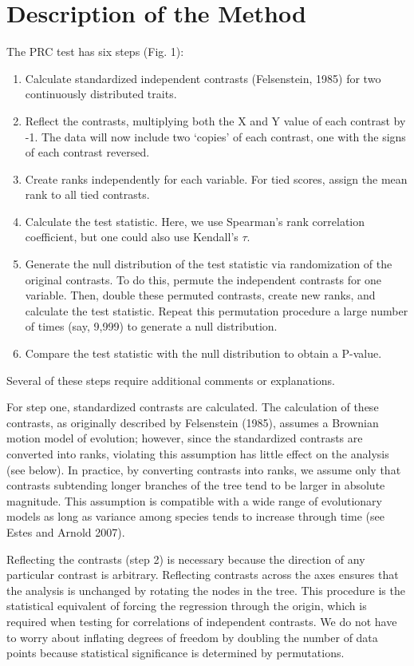 \documentclass[fleqn,10pt,lineno]{wlpeerj} %
\begin{document}
\section{Description of the Method}\label{description-of-the-method}

The PRC test has six steps (Fig. 1):

\begin{enumerate}
\def\labelenumi{\arabic{enumi}.}
\item
  Calculate standardized independent contrasts (Felsenstein, 1985) for two continuously distributed traits.
\item
  Reflect the contrasts, multiplying both the X and Y value of each contrast by -1. The data will now include two `copies' of each contrast, one with the signs of each contrast reversed.
\item
  Create ranks independently for each variable. For tied scores, assign the mean rank to all tied contrasts.
\item
  Calculate the test statistic. Here, we use Spearman's rank correlation coefficient, but one could also use Kendall's \(\tau\).
\item
  Generate the null distribution of the test statistic via randomization of the original contrasts. To do this, permute the independent contrasts for one variable. Then, double these permuted contrasts, create new ranks, and calculate the test statistic. Repeat this permutation procedure a large number of times (say, 9,999) to generate a null distribution.
\item
  Compare the test statistic with the null distribution to obtain a P-value.
\end{enumerate}

Several of these steps require additional comments or explanations.

For step one, standardized contrasts are calculated. The calculation of these contrasts, as originally described by Felsenstein (1985), assumes a Brownian motion model of evolution; however, since the standardized contrasts are converted into ranks, violating this assumption has little effect on the analysis (see below). In practice, by converting contrasts into ranks, we assume only that contrasts subtending longer branches of the tree tend to be larger in absolute magnitude. This assumption is compatible with a wide range of evolutionary models as long as variance among species tends to increase through time (see Estes and Arnold 2007).

Reflecting the contrasts (step 2) is necessary because the direction of any particular contrast is arbitrary. Reflecting contrasts across the axes ensures that the analysis is unchanged by rotating the nodes in the tree. This procedure is the statistical equivalent of forcing the regression through the origin, which is required when testing for correlations of independent contrasts. We do not have to worry about inflating degrees of freedom by doubling the number of data points because statistical significance is determined by permutations.
\end{document}
